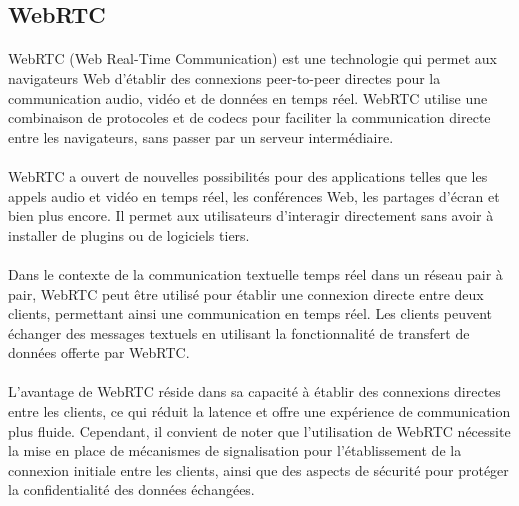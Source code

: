 \subsection{WebRTC}

\paragraph{}
WebRTC (Web Real-Time Communication) est une technologie qui permet aux navigateurs Web d'établir des connexions peer-to-peer directes pour la communication audio, vidéo et de données en temps réel. 
WebRTC utilise une combinaison de protocoles et de codecs pour faciliter la communication directe entre les navigateurs, sans passer par un serveur intermédiaire.

\paragraph{}
WebRTC a ouvert de nouvelles possibilités pour des applications telles que les appels audio et vidéo en temps réel, les conférences Web, les partages d'écran et bien plus encore. Il permet aux utilisateurs 
d'interagir directement sans avoir à installer de plugins ou de logiciels tiers.

\paragraph{}
Dans le contexte de la communication textuelle temps réel dans un réseau pair à pair, WebRTC peut être utilisé pour établir une connexion directe entre deux clients, permettant ainsi une communication en temps réel. 
Les clients peuvent échanger des messages textuels en utilisant la fonctionnalité de transfert de données offerte par WebRTC.

\paragraph{}
L'avantage de WebRTC réside dans sa capacité à établir des connexions directes entre les clients, ce qui réduit la latence et offre une expérience de communication plus fluide. Cependant, il convient de noter que 
l'utilisation de WebRTC nécessite la mise en place de mécanismes de signalisation pour l'établissement de la connexion initiale entre les clients, ainsi que des aspects de sécurité pour protéger la confidentialité des données échangées.



